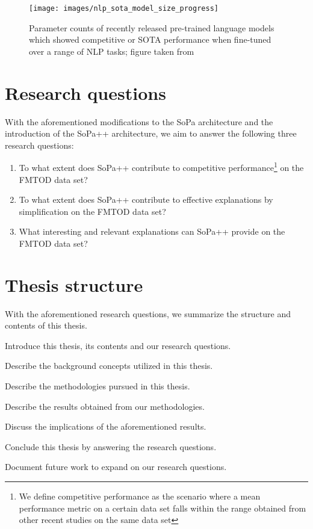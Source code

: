 \begin{figure}[th]
  \centering
  \texttt{[image: images/nlp\_sota\_model\_size\_progress]}
  \caption{Parameter counts of recently released pre-trained language models which showed competitive or SOTA performance when fine-tuned over a range of NLP tasks; figure taken from \citet{sanh2019distilbert}}
  \label{fig:nlp_progress}
\end{figure}

\section{Research questions}

With the aforementioned modifications to the SoPa architecture and the introduction of the SoPa++ architecture, we aim to answer the following three research questions:

\begin{enumerate}
  \item To what extent does SoPa++ contribute to competitive performance\footnote{We define competitive performance as the scenario where a mean performance metric on a certain data set falls within the range obtained from other recent studies on the same data set} on the FMTOD data set?
  \item To what extent does SoPa++ contribute to effective explanations by simplification on the FMTOD data set?
  \item What interesting and relevant explanations can SoPa++ provide on the FMTOD data set?
\end{enumerate}

\section{Thesis structure}

With the aforementioned research questions, we summarize the structure and contents of this thesis.

\begin{description}[align=left]
  \item [Chapter 1:] Introduce this thesis, its contents and our research questions.
  \item [Chapter 2:] Describe the background concepts utilized in this thesis.
  \item [Chapter 3:] Describe the methodologies pursued in this thesis.
  \item [Chapter 4:] Describe the results obtained from our methodologies.
  \item [Chapter 5:] Discuss the implications of the aforementioned results.
  \item [Chapter 6:] Conclude this thesis by answering the research questions.
  \item [Chapter 7:] Document future work to expand on our research questions.
\end{description}


